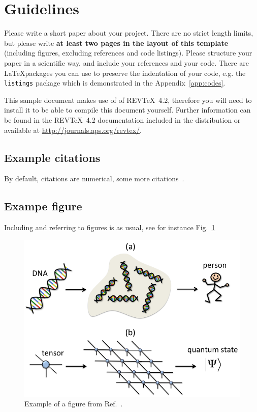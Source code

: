 
\section{Guidelines}

Please write a short paper about your project. There are no strict length limits, but please write \textbf{at least two pages in the layout of this template} (including figures, excluding references and code listings). Please structure your paper in a scientific way, and include your references and your code. There are \LaTeX packages you can use to preserve the indentation of your code, e.g. the \texttt{listings} package which is demonstrated in the Appendix~\ref{app:codes}.

This sample document makes use of of REV\TeX~4.2, therefore you will need to install it to be able to compile this document yourself. Further information can be found in the REV\TeX~4.2
documentation included in the distribution or available at
\url{http://journals.aps.org/revtex/}.


\subsection{Example citations}
By default, citations are numerical\cite{epr}, some more citations~\cite{feyn54,Bire82,Berman1983,witten2001,Davies1998}. 

\subsection{Exampe figure}
Including and referring to figures is as usual, see for instance Fig.~\ref{fig:example}
\begin{figure}
\includegraphics[width=0.99\linewidth]{cartoon.png}
\caption{Example of a figure from Ref.~\cite{Orus2013}.}
\label{fig:example}
\end{figure}
